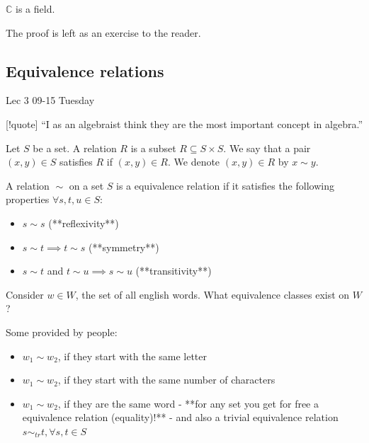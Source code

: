 \documentclass[12pt]{article}
\newcommand{\lecdate}[1]{ %
    \vspace{0in}
    \begin{flushright}
        #1
    \end{flushright}
    \vspace{0in}
}
\begin{document}
\begin{thm}
    ${}\mathbb{C}{}$ is a field.
\end{thm}
\begin{pf}
    The proof is left as an exercise to the reader.
\end{pf}

\subsection{Equivalence relations}
\lecdate{Lec 3 09-15 Tuesday}

[!quote] ``I as an algebraist think they are the most important concept in algebra.''

\begin{defn}
    Let ${}S{}$ be a set. A relation ${}R{}$ is a subset ${}R \subseteq S \times S{}$. We say that a pair ${}(x,y)\in S{}$ satisfies ${}R{}$ if ${}(x,y) \in R{}$. We denote ${}(x,y) \in R{}$ by ${}x\sim y{}$.
\end{defn}

\begin{defn}
    A relation ${}\sim{}$ on a set ${}S{}$ is a equivalence relation if it satisfies the following properties ${}\forall s,t,u \in S{}$:
    \begin{itemize}
        \item ${}s \sim s{}$ (**reflexivity**)
        \item ${}s \sim t \implies t \sim s{}$ (**symmetry**)
        \item ${}s\sim t{}$ and ${}t \sim u \implies s\sim u{}$ (**transitivity**)
    \end{itemize}
\end{defn}
\begin{exercise} Consider $w \in W$, the set of all english words. What equivalence classes exist on $W$?
\end{exercise}
\begin{ex} Some provided by people:
    \begin{itemize}
        \item ${}w_{1} \sim w_{2}{}$, if they start with the same letter
        \item ${}w_{1} \sim w_{2}{}$, if they start with the same number of characters
        \item ${}w_{1} \sim w_{2}{}$, if they are the same word
            - **for any set you get for free a equivalence relation (equality)!**
            - and also a trivial equivalence relation ${}s \sim_{tr} t, \forall s,t\in S{}$
    \end{itemize}
\end{ex}
\end{document}

